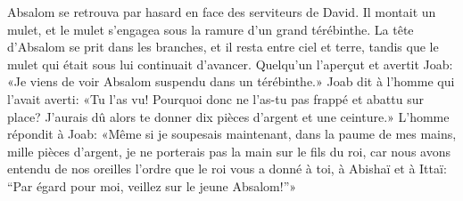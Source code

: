 Absalom se retrouva par hasard en face des serviteurs de David.
Il montait un mulet, et le mulet s’engagea sous la ramure d’un grand térébinthe.
La tête d’Absalom se prit dans les branches, et il resta entre ciel et terre,
	tandis que le mulet qui était sous lui continuait d’avancer.
Quelqu’un l’aperçut et avertit Joab:
	«Je viens de voir Absalom suspendu dans un térébinthe.»
Joab dit à l’homme qui l’avait averti:
	«Tu l’as vu!
		Pourquoi donc ne l’as-tu pas frappé et abattu sur place?
	J’aurais dû alors te donner dix pièces d’argent et une ceinture.»
L’homme répondit à Joab:
	«Même si je soupesais maintenant, dans la paume de mes mains, mille pièces d’argent,
	je ne porterais pas la main sur le fils du roi,
	car nous avons entendu de nos oreilles l’ordre que le roi vous a donné
	à toi, à Abishaï et à Ittaï:
	“Par égard pour moi, veillez sur le jeune Absalom!”»
